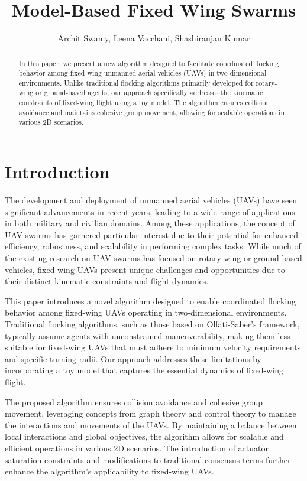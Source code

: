\documentclass[letterpaper, 10 pt, conference]{ieeeconf}  %
\title{\LARGE \bf Model-Based Fixed Wing Swarms}
\author{Archit Swamy, Leena Vacchani, Shashiranjan Kumar}%
\begin{document}
\maketitle
\thispagestyle{empty}
\pagestyle{empty}

\begin{abstract}
In this paper, we present a new algorithm designed to facilitate coordinated flocking behavior among fixed-wing unmanned aerial vehicles (UAVs) in two-dimensional environments. Unlike traditional flocking algorithms primarily developed for rotary-wing or ground-based agents, our approach specifically addresses the kinematic constraints of fixed-wing flight using a toy model. The algorithm ensures collision avoidance and maintains cohesive group movement, allowing for scalable operations in various 2D scenarios. 
\end{abstract}

\section{Introduction}

The development and deployment of unmanned aerial vehicles (UAVs) have seen significant advancements in recent years, leading to a wide range of applications in both military and civilian domains. Among these applications, the concept of UAV swarms has garnered particular interest due to their potential for enhanced efficiency, robustness, and scalability in performing complex tasks. While much of the existing research on UAV swarms has focused on rotary-wing or ground-based vehicles, fixed-wing UAVs present unique challenges and opportunities due to their distinct kinematic constraints and flight dynamics.

This paper introduces a novel algorithm designed to enable coordinated flocking behavior among fixed-wing UAVs operating in two-dimensional environments. Traditional flocking algorithms, such as those based on Olfati-Saber's framework, typically assume agents with unconstrained maneuverability, making them less suitable for fixed-wing UAVs that must adhere to minimum velocity requirements and specific turning radii. Our approach addresses these limitations by incorporating a toy model that captures the essential dynamics of fixed-wing flight.

The proposed algorithm ensures collision avoidance and cohesive group movement, leveraging concepts from graph theory and control theory to manage the interactions and movements of the UAVs. By maintaining a balance between local interactions and global objectives, the algorithm allows for scalable and efficient operations in various 2D scenarios. The introduction of actuator saturation constraints and modifications to traditional consensus terms further enhance the algorithm's applicability to fixed-wing UAVs.
\end{document}
